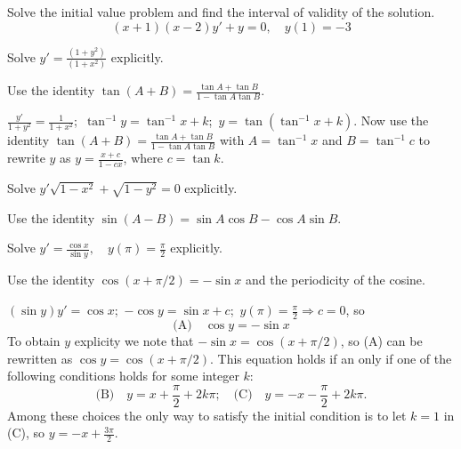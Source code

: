 \documentclass{ximera}
\begin{document}
\begin{problem}\label{exer:2.2.23} Solve the initial value problem and find the interval of validity of the solution.
$$(x+1)(x-2)y'+y=0, \quad y(1)=-3$$
\end{problem}

\begin{problem}\label{exer:2.2.24} Solve $y'=\frac{(1+y^2)}{(1+x^2)}$ explicitly.
\begin{hint}Use the identity
$\tan(A+B)=\frac{\tan A+\tan B}{1-\tan A\tan B}$.
\end{hint}

 

\begin{solution}
    $\frac{y'}{1+y^2}=\frac{1}{1+x^2}$;\ $\tan^{-1}y=
\tan^{-1}x+k$;\ $y=\tan(\tan^{-1}x+k)$. Now use
the identity $\tan(A+B)=\frac{\tan A+\tan B}{1-\tan A\tan B}$ with
$A=\tan^{-1}x$ and $B=\tan^{-1}c$ to rewrite $y$ as
$y=\frac{x+c}{1-cx}$, where $c=\tan k$.
\end{solution}
\end{problem}

\begin{problem}\label{exer:2.2.25} Solve $y'\sqrt{1-x^2}+\sqrt{1-y^2}=0$ explicitly.
\begin{hint}Use the identity
$\sin(A-B)=\sin A\cos B-\cos A\sin B$.
\end{hint}
\end{problem}

\begin{problem}\label{exer:2.2.26}
Solve $y'=\frac{\cos x}{\sin y},\quad y (\pi)=\frac{\pi}{2}$
explicitly. 
\begin{hint}Use the identity $\cos(x+\pi/2)=-\sin x$ and the
periodicity of the cosine.
\end{hint}

 

\begin{solution}
    $(\sin y)y'=\cos x$;\ $-\cos
y=\sin x+c$;\  $y(\pi)=\frac{\pi}{2}\Rightarrow
c=0$, so $$\text{(A)}\quad  \cos y=-\sin
x$$ To obtain $y$ explicity we  note that $-\sin x=\cos(x+\pi/2)$, so
(A) can be rewritten as  $\cos y=\cos(x+\pi/2)$. This equation
holds if an only if one of the following conditions holds for some
integer $k$:
$$
\text{(B)}\quad y=x+\frac{\pi}{2}+2k\pi;\quad
\text{(C)}\quad
y=-x-\frac{\pi}{2}+2k\pi.
$$
Among these choices the only way to satisfy the initial condition
is to let $k=1$ in (C), so $y=-x+\frac{3\pi}{2}.$
\end{solution}
\end{problem}
\end{document}
